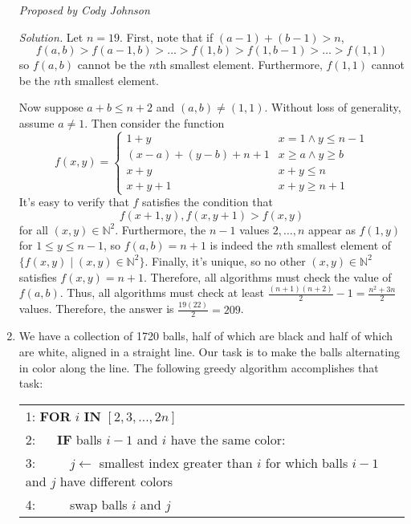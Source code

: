 \documentclass[10pt]{article}
\newcommand{\proposed}[1]
{
\vspace{5pt}
\noindent\textit{Proposed by #1}
}
\newcommand{\solution}
{
\vspace{5pt}
\noindent\textit{Solution.}\qquad
}
\begin{document}
\begin{enumerate}
\proposed{Cody Johnson}

\solution Let $n=19$. First, note that if $(a-1)+(b-1)>n$, \[f(a,b)>f(a-1,b)>\dots>f(1,b)>f(1,b-1)>\dots>f(1,1)\] so $f(a,b)$ cannot be the $n$th smallest element. Furthermore, $f(1,1)$ cannot be the $n$th smallest element.

Now suppose $a+b\le n+2$ and $(a,b)\neq(1,1)$. Without loss of generality, assume $a\neq1$. Then consider the function \[f(x,y)=\begin{cases}1+y & x=1\land y\le n-1 \\ (x-a)+(y-b)+n+1 & x\ge a\land y\ge b \\ x+y & x+y\le n \\ x+y+1 & x+y\ge n+1\end{cases}\] It's easy to verify that $f$ satisfies the condition that \[f(x+1,y),f(x,y+1)>f(x,y)\] for all $(x,y)\in\mathbb N^2$. Furthermore, the $n-1$ values $2,\dots,n$ appear as $f(1,y)$ for $1\le y\le n-1$, so $f(a,b)=n+1$ is indeed the $n$th smallest element of $\{f(x,y)\mid(x,y)\in\mathbb N^2\}$. Finally, it's unique, so no other $(x,y)\in\mathbb N^2$ satisfies $f(x,y)=n+1$. Therefore, all algorithms must check the value of $f(a,b)$. Thus, all algorithms must check at least $\frac{(n+1)(n+2)}2-1=\frac{n^2+3n}2$ values. Therefore, the answer is $\frac{19(22)}2=\boxed{209}$.


\item We have a collection of 1720 balls, half of which are black and half of which are white, aligned in a straight line. Our task is to make the balls alternating in color along the line. The following greedy algorithm accomplishes that task:

\iffalse
\begin{verbatim}
for i = 2, 3, ..., 2n
  if balls i-1 and i have the same color
    j <- smallest index > i for which balls i-1 and j have different colors
    swap balls i and j
\end{verbatim}
\fi

\begin{tabular}{l}
1: \textbf{FOR} $i$ \textbf{IN} $[2,3,\dots,2n]$ \\
2: $\quad$ \textbf{IF} balls $i-1$ and $i$ have the same color: \\
3: $\quad\quad$ $j\gets$ smallest index greater than $i$ for which balls $i-1$ and $j$ have different colors \\
4: $\quad\quad$ swap balls $i$ and $j$
\end{tabular}


\end{enumerate}
\end{document}
